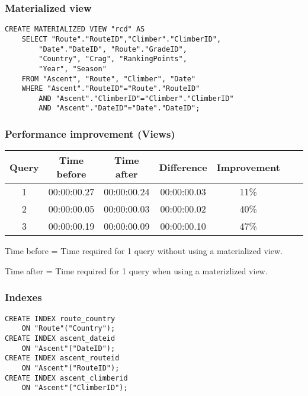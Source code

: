 \documentclass[]{beamer}
\begin{document}
\begin{frame}[fragile]
\frametitle{Materialized view}

\begin{lstlisting}
CREATE MATERIALIZED VIEW "rcd" AS
	SELECT "Route"."RouteID","Climber"."ClimberID", 
		"Date"."DateID", "Route"."GradeID", 
		"Country", "Crag", "RankingPoints", 
		"Year", "Season"
	FROM "Ascent", "Route", "Climber", "Date" 
	WHERE "Ascent"."RouteID"="Route"."RouteID"
		AND "Ascent"."ClimberID"="Climber"."ClimberID"
		AND "Ascent"."DateID"="Date"."DateID";
\end{lstlisting}
\end{frame}

\begin{frame}
\frametitle{Performance improvement (Views)}

\begin{table}[ht!]
\begin{tabular}{|c|c|c|c|c|c|c|}
\hline
Query & Time before & Time after & Difference & Improvement\tabularnewline
\hline
\hline
1 & 00:00:00.27 & 00:00:00.24 & 00:00:00.03 & 11\% \tabularnewline
\hline 
2 & 00:00:00.05 & 00:00:00.03 & 00:00:00.02 & 40\% \tabularnewline
\hline 
3 & 00:00:00.19 & 00:00:00.09 & 00:00:00.10 & 47\% \tabularnewline
\hline 
\end{tabular}
\end{table}
Time before = Time required for 1 query without using a materialized view.

Time after = Time required for 1 query when using a materizlized view.
\end{frame}

\begin{frame}[fragile]
\frametitle{Indexes}

\begin{lstlisting}
CREATE INDEX route_country 
	ON "Route"("Country"); 
CREATE INDEX ascent_dateid 
	ON "Ascent"("DateID"); 
CREATE INDEX ascent_routeid 
	ON "Ascent"("RouteID");
CREATE INDEX ascent_climberid 
	ON "Ascent"("ClimberID"); 
\end{lstlisting}
\end{frame}
\end{document}

